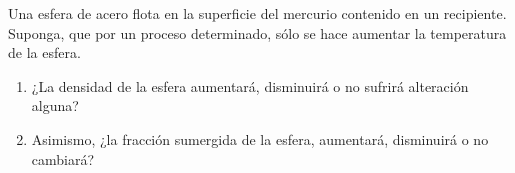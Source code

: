 
Una esfera de acero flota en la superficie del mercurio contenido en un recipiente. Suponga, que por un proceso determinado, sólo se hace aumentar la temperatura de la esfera.
\begin{enumerate}
    \item ¿La densidad de la esfera aumentará, disminuirá o no sufrirá alteración alguna?
    \item Asimismo, ¿la fracción sumergida de la esfera, aumentará, disminuirá o no cambiará?
\end{enumerate}